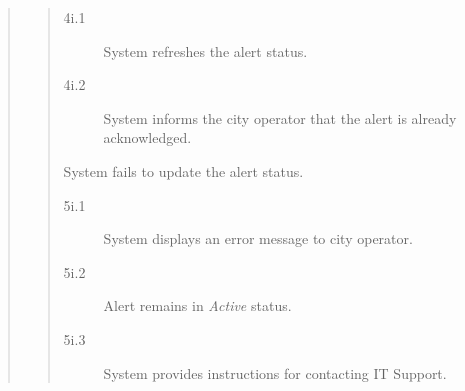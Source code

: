 \documentclass[]{article}
\begin{document}
\begin{enumerate}[{\bf BE5.}]
\begin{quote}
\begin{quote}
\begin{description}
\begin{description}
                            \item[\textmd{4i.1}] System refreshes the alert status.
                            \item[\textmd{4i.2}] System informs the city operator that the alert is already acknowledged.
                        \end{description}
                        \item[\textmd{5i.}] System fails to update the alert status.
                        \begin{description}
                            \item[\textmd{5i.1}] System displays an error message to city operator.
                            \item[\textmd{5i.2}] Alert remains in \textit{Active} status.
                            \item[\textmd{5i.3}] System provides instructions for contacting IT Support.
                        \end{description}
                    \end{description}
                \end{quote}
        	\end{quote}
\end{enumerate}
\end{document}
